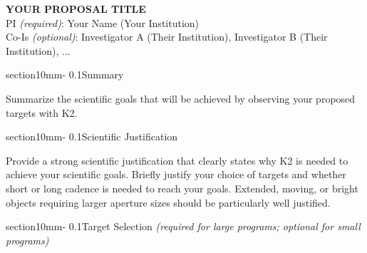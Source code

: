 \documentclass[letterpaper,12pt]{article}
\makeatletter
\renewcommand{\section}{\@startsection%
{section}{1}{0mm}{-\baselineskip}%
{0.1\baselineskip}{\normalfont\bfseries}}%
\makeatother
\begin{document}
\pagestyle{plain}


 

\begin{center} 
\textbf{\uppercase{%
YOUR PROPOSAL TITLE \\
}}
PI \textit{(required)}: Your Name (Your Institution) \\
Co-Is \textit{(optional)}: Investigator A (Their Institution), Investigator B (Their Institution), ... \\
\end{center}





\section{Summary}

Summarize the scientific goals that will be achieved by observing your proposed targets with K2.


\section{Scientific Justification}

Provide a strong scientific justification that clearly states why K2 is needed to achieve your scientific goals. Briefly justify your choice of targets and whether short or long cadence is needed to reach your goals. Extended, moving, or bright objects requiring larger aperture sizes should be particularly well justified.

\section{Target Selection \textit{(required for large programs; optional for small programs)}}
\end{document}
